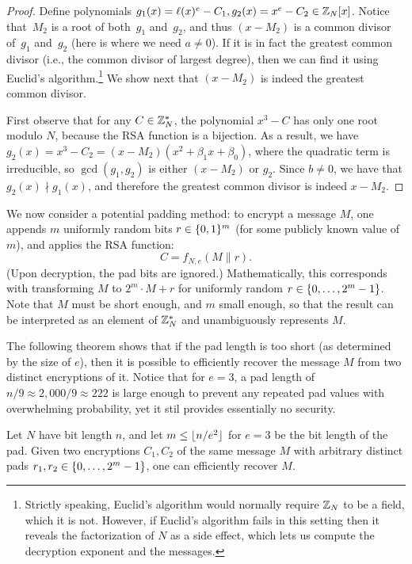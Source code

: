 \documentclass[11pt]{article}
\begin{document}
\begin{proof}
  Define polynomials
  $g_1(x)=\ell(x)^{e}-C_1, g_2(x)=x^{e}-C_2 \in \mathbb{Z}_{N}[x]$.  Notice
  that~$M_2$ is a root of both~$g_1$ and~$g_2$, and thus $(x-M_2)$ is
  a common divisor of~$g_1$ and~$g_2$ (here is where we need
  $a \neq 0$). If it is in fact the greatest common divisor (i.e., the
  common divisor of largest degree), then we can find it using
  Euclid's algorithm.\footnote{Strictly speaking, Euclid's algorithm
    would normally require $\mathbb{Z}_{N}$ to be a field, which it is
    not. However, if Euclid's algorithm fails in this setting then it
    reveals the factorization of $N$ as a side effect, which lets us
    compute the decryption exponent and the messages.}  We show next
  that $(x-M_{2})$ is indeed the greatest common divisor.

  First observe that for any $C \in \mathbb{Z}_{N}^*$, the polynomial $x^3-C$
  has only one root modulo $N$, because the RSA function is a
  bijection. As a result, we have
  $g_2(x)=x^3-C_2=(x-M_{2})(x^2+\beta_1x+\beta_0)$, where the
  quadratic term is irreducible, so $\gcd(g_{1}, g_{2})$ is either
  $(x-M_{2})$ or $g_{2}$.  Since $b \neq 0$, we have that $g_2(x)
  \nmid g_1(x)$, and therefore the greatest common divisor is indeed
  $x-M_{2}$.
\end{proof}

We now consider a potential padding method: to encrypt a message $M$,
one appends $m$ uniformly random bits $r \in \{0,1\}^{m}$ (for some
publicly known value of $m$), and applies the RSA function:
\[ C=f_{N,e}(M \| r). \] (Upon decryption, the pad bits are ignored.)
Mathematically, this corresponds with transforming $M$ to $2^{m} \cdot
M + r$ for uniformly random $r \in \{0, \ldots, 2^{m}-1\}$.  Note
that $M$ must be short enough, and $m$ small enough, so that the
result can be interpreted as an element of $\mathbb{Z}_{N}^{*}$ and
unambiguously represents $M$.

The following theorem shows that if the pad length is too short (as
determined by the size of $e$), then it is possible to efficiently
recover the message $M$ from two distinct encryptions of it.  Notice
that for $e=3$, a pad length of $n/9 \approx 2{,}000/9 \approx 222$ is
large enough to prevent any repeated pad values with overwhelming
probability, yet it stil provides essentially no security.

\begin{theorem}
  \label{thm:small-e-padding}
  Let $N$ have bit length $n$, and let $m \leq \lfloor n/e^2\rfloor$ for
  $e=3$ be the bit length of the pad.  Given two encryptions
  $C_1, C_2$ of the same message $M$ with arbitrary distinct pads
  $r_{1}, r_{2} \in \{0, \ldots, 2^{m}-1\}$, one can efficiently
  recover $M$.
\end{theorem}
\end{document}

